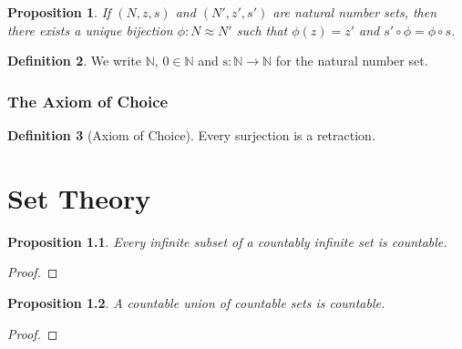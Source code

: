 \documentclass{book}
\let\qed\relax
\newtheorem{prop}{Proposition}[chapter]
\theoremstyle{definition}
\newtheorem{df}[prop]{Definition}
\begin{document}
\begin{prop}
If $(N,z,s)$ and $(N',z',s')$ are natural number sets, then there exists a unique bijection $\phi : N \approx N'$ such that $\phi(z) = z'$ and $s' \circ \phi = \phi \circ s$.
\end{prop}


\begin{df}
We write $\mathbb{N}$, $0 \in \mathbb{N}$ and $\mathrm{s} : \mathbb{N} \rightarrow \mathbb{N}$ for the natural number set.
\end{df}

\subsection{The Axiom of Choice}

\begin{df}[Axiom of Choice]
Every surjection is a retraction.
\end{df}

\chapter{Set Theory}



\begin{prop}
Every infinite subset of a countably infinite set is countable.
\end{prop}

\begin{proof}
\pf
{}
\qed
\end{proof}

\begin{prop}
A countable union of countable sets is countable.
\end{prop}

\begin{proof}
\pf
{}
\qed
\end{proof}
\end{document}
